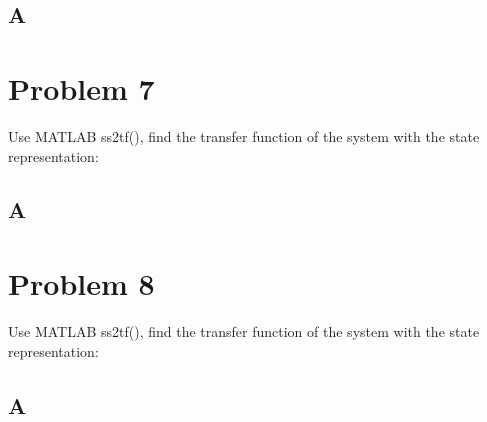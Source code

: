 \documentclass{article}
\begin{document}
\subsection*{A}
\clearpage

\section*{Problem 7}
Use MATLAB ss2tf(), find the transfer function of the system with the state representation:



\subsection*{A}
\clearpage
\section*{Problem 8}
Use MATLAB ss2tf(), find the transfer function of the system with the state representation:

\subsection*{A}
\clearpage

%
\end{document}
